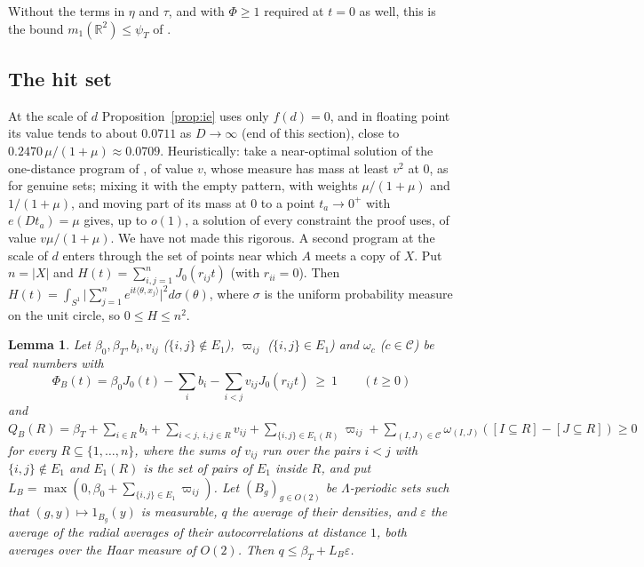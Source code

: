 \documentclass[11pt,a4paper]{amsart}
\newtheorem{lemma}[theorem]{Lemma}
\theoremstyle{definition}
\theoremstyle{remark}
\newcommand{\R}{\mathbb{R}}
\begin{document}
Without the terms in $\eta$ and $\tau$, and with $\Phi\ge1$ required at $t=0$ as well, this is the bound
$m_1(\R^2)\le\psi_T$ of \cite{ACMVZ}.

\subsection*{The hit set}
At the scale of $d$ Proposition~\ref{prop:ie} uses only $f(d)=0$, and in floating point its value tends to about
$0.0711$ as $D\to\infty$ (end of this section), close to $0.2470\,\mu/(1+\mu)\approx0.0709$. Heuristically: take a
near-optimal solution of the one-distance program of \cite{ACMVZ}, of value $v$, whose measure has mass at least $v^2$
at $0$, as for genuine sets; mixing it with the empty pattern, with weights $\mu/(1+\mu)$ and $1/(1+\mu)$, and moving
part of its mass at $0$ to a point $t_a\to0^+$ with $e(Dt_a)=\mu$ gives, up to $o(1)$, a solution of every constraint
the proof uses, of value $v\mu/(1+\mu)$. We have not made this rigorous. A second program at the scale of $d$ enters
through the set of points near which $A$ meets a copy of $X$. Put $n=|X|$ and $H(t)=\sum_{i,j=1}^nJ_0(r_{ij}t)$ (with
$r_{ii}=0$). Then $H(t)=\int_{S^1}\bigl|\sum_{j=1}^ne^{it\langle\theta,x_j\rangle}\bigr|^2d\sigma(\theta)$, where
$\sigma$ is the uniform probability measure on the unit circle, so $0\le H\le n^2$.

\begin{lemma}\label{lem:near}
Let $\beta_0,\beta_T,b_i,v_{ij}$ ($\{i,j\}\notin E_1$), $\varpi_{ij}$ ($\{i,j\}\in E_1$) and $\omega_c$ ($c\in\mathcal C$) be
real numbers with
\[
\Phi_B(t)=\beta_0J_0(t)-\sum_ib_i-\sum_{i<j}v_{ij}J_0(r_{ij}t)\ \ge\ 1\qquad(t\ge0)
\]
and $Q_B(R)=\beta_T+\sum_{i\in R}b_i+\sum_{i<j,\ i,j\in R}v_{ij}+\sum_{\{i,j\}\in E_1(R)}\varpi_{ij}+\sum_{(I,J)\in\mathcal C}
\omega_{(I,J)}([I\subseteq R]-[J\subseteq R])\ge0$ for \emph{every} $R\subseteq\{1,\dots,n\}$, where the sums of
$v_{ij}$ run over the pairs $i<j$ with $\{i,j\}\notin E_1$ and $E_1(R)$ is the set of pairs of $E_1$ inside $R$, and
put $L_B=\max(0,\beta_0+\sum_{\{i,j\}\in E_1}\varpi_{ij})$. Let $(B_g)_{g\in O(2)}$ be $\Lambda$-periodic sets such that
$(g,y)\mapsto1_{B_g}(y)$ is measurable, $q$ the average of their densities, and $\varepsilon$ the average of the radial
averages of their autocorrelations at distance $1$, both averages over the Haar measure of $O(2)$. Then
$q\le\beta_T+L_B\varepsilon$.
\end{lemma}
\end{document}
